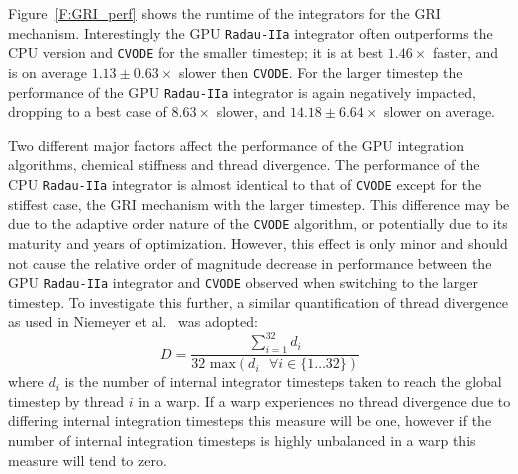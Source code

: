 \documentclass[preprint]{elsarticle}
\begin{document}
Figure~\ref{F:GRI_perf} shows the runtime of the integrators for the GRI mechanism.
Interestingly the GPU \texttt{Radau-IIa} integrator often outperforms the CPU version and \texttt{CVODE} for the smaller timestep; it is at best $1.46\times$ faster, and is on average $1.13\pm0.63\times$ slower then \texttt{CVODE}.
For the larger timestep the performance of the GPU \texttt{Radau-IIa} integrator is again negatively impacted, dropping to a best case of $8.63\times$ slower, and $14.18\pm6.64\times$ slower on average.

Two different major factors affect the performance of the GPU integration algorithms, chemical stiffness and thread divergence.
The performance of the CPU \texttt{Radau-IIa} integrator is almost identical to that of \texttt{CVODE} except for the stiffest case, the GRI mechanism with the larger timestep.
This difference may be due to the adaptive order nature of the \texttt{CVODE} algorithm, or potentially due to its maturity and years of optimization.
However, this effect is only minor and should not cause the relative order of magnitude decrease in performance between the GPU \texttt{Radau-IIa} integrator and \texttt{CVODE} observed when switching to the larger timestep.
To investigate this further, a similar quantification of thread divergence as used in Niemeyer et al.~\cite{Niemeyer:2014aa} was adopted:
\begin{equation}
  D = \frac{\sum_{i=1}^{32}{d_i}}{32\text{ max}\left(d_i\text{ }\forall i \in \lbrace 1 \ldots 32 \rbrace \right)}
\end{equation}
where $d_i$ is the number of internal integrator timesteps taken to reach the global timestep by thread $i$ in a warp.
If a warp experiences no thread divergence due to differing internal integration timesteps this measure will be one, however if the number of internal integration timesteps is highly unbalanced in a warp this measure will tend to zero.
\end{document}
